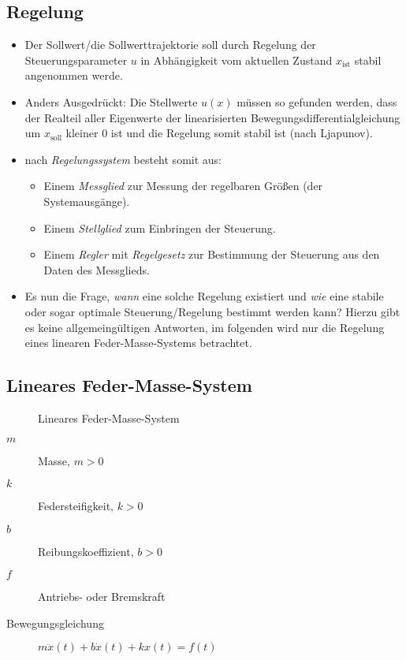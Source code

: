 \documentclass[a4paper, 11pt, accentcolor = tud3b]{tudreport}
\begin{document}
            \subsection{Regelung} %
                \begin{itemize}
                	\item Der Sollwert/die Sollwerttrajektorie soll durch Regelung der Steuerungsparameter \(u\) in Abhängigkeit vom aktuellen Zustand \(x_\text{ist}\) stabil angenommen werde.
                	\item Anders Ausgedrückt: Die Stellwerte \(u(x)\) müssen so gefunden werden, dass der Realteil aller Eigenwerte der linearisierten Bewegungsdifferentialgleichung um \(x_\text{soll}\) kleiner \(0\) ist und die Regelung somit stabil ist (nach Ljapunov).
                	\item nach \textit{Regelungssystem} besteht somit aus:
	                	\begin{itemize}
	                		\item Einem \textit{Messglied} zur Messung der regelbaren Größen (der Systemausgänge).
	                		\item Einem \textit{Stellglied} zum Einbringen der Steuerung.
	                		\item Einem \textit{Regler} mit \textit{Regelgesetz} zur Bestimmung der Steuerung aus den Daten des Messglieds.
	                	\end{itemize}
                	\item Es nun die Frage, \textit{wann} eine solche Regelung existiert und \textit{wie} eine stabile oder sogar optimale Steuerung/Regelung bestimmt werden kann? Hierzu gibt es keine allgemeingültigen Antworten, im folgenden wird nur die Regelung eines linearen Feder-Masse-Systems betrachtet.
                \end{itemize}

			\subsection{Lineares Feder-Masse-System} %
				\begin{figure}[H]
					\centering
					
					\caption{Lineares Feder-Masse-System}
				\end{figure}
				
				\begin{description}
					\item[\(m\)] Masse, \( m > 0 \)
					\item[\(k\)] Federsteifigkeit, \( k > 0 \)
					\item[\(b\)] Reibungskoeffizient, \( b > 0 \)
					\item[\(f\)] Antriebs- oder Bremskraft
					\item[Bewegungsgleichung] \( m\ddot{x}(t) + b\dot{x}(t) + kx(t) = f(t) \)
				\end{description}
				
\end{document}
